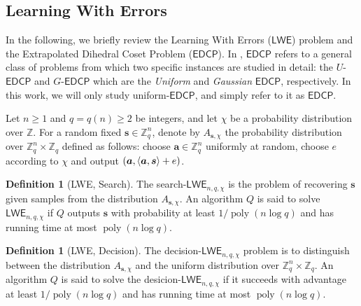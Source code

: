 \documentclass[11pt]{article}
\theoremstyle{plain}
\theoremstyle{definition}
\newtheorem{definition}[theorem]{Definition}
\DeclareMathOperator{\poly}{poly}
\DeclarePairedDelimiter{\lrang}{\langle}{\rangle}
\def\Z{\mathbb{Z}}
\def\lwe{\mathsf{LWE}}
\def\edcp{\mathsf{EDCP}}
\begin{document}
\subsection{Learning With Errors}

In the following, we briefly review the Learning With Errors ($\lwe$) problem and the Extrapolated Dihedral Coset Problem ($\edcp$). In \cite{brakerski2018learning}, $\edcp$ refers to a general class of problems from which two specific instances are studied in detail: the $U$-$\edcp$ and $G$-$\edcp$ which are the \textit{Uniform} and \textit{Gaussian} $\edcp$, respectively. In this work, we will only study uniform-$\edcp$, and simply refer to it as $\edcp$.

Let $n \ge 1$ and $q = q(n) \ge 2$ be integers, and let $\chi$ be a probability distribution over $\Z$. For a random fixed $\bm{s} \in \Z_q^n$, denote by $A_{\bm{s}, \chi}$ the probability distribution over $\Z_q^n \times \Z_q$ defined as follows: choose $\bm{a} \in \Z_q^n$ uniformly at random, choose $e$ according to $\chi$ and output $(\bm{a}, \lrang{\bm{a}, \bm{s}} + e)$.

\begin{definition}[LWE, Search]
The search-$\lwe_{n, q, \chi}$ is the problem of recovering $\bm{s}$ given samples from the distribution $A_{\bm{s}, \chi}$. An algorithm $Q$ is said to solve $\lwe_{n, q, \chi}$ if $Q$  outputs $\bm{s}$ with probability at least $1 / \poly(n\log q)$ and has running time at most $\poly(n \log q)$.
\end{definition}

\begin{definition}[LWE, Decision]
    The decision-$\lwe_{n, q, \chi}$ problem is to distinguish between the distribution $A_{\bm{s}, \chi}$ and the uniform distribution over $\Z_q^n \times \Z_q$. An algorithm $Q$ is said to solve the desicion-$\lwe_{n, q, \chi}$ if it succeeds with advantage at least $1 / \poly(n\log q)$ and has running time at most $\poly(n\log q)$. 
\end{definition}
\end{document}
